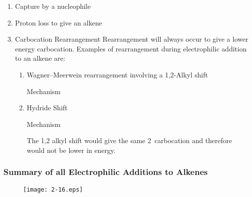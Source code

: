 \begin{enumerate}[label=\alph*)]

  \item Capture by a nucleophile

  \item Proton loss to give an alkene

  \item Carbocation Rearrangement
    Rearrangement will always occur to give a lower energy carbocation. Examples
    of rearrangement during electrophilic addition to an alkene are:

    \begin{enumerate}[label=\roman*)]

      \item Wagner--Meerwein rearrangement involving a 1,2-Alkyl shift


        Mechanism


      \item Hydride Shift


        Mechanism


        The 1,2 alkyl shift would give the same 2\de\ carbocation and therefore
        would not be lower in energy.
    \end{enumerate}

\end{enumerate}

\pagebreak %

\thispagestyle{empty} %

\begin{landscape}
  \subsubsection{Summary of all Electrophilic Additions to Alkenes}


  \vspace*{\fill}
  \begin{figure}[H]
    \centering
    \texttt{[image: 2-16.eps]}
  \end{figure}
  \vspace*{\fill}
\end{landscape}


